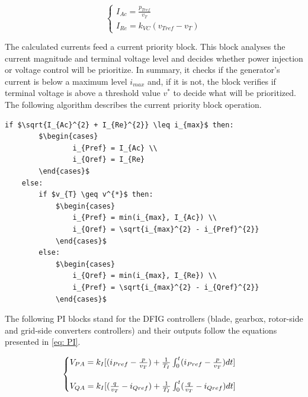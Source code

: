 \begin{equation}
	\begin{cases}
		I_{Ac} = \frac{p_{Tref}}{v_{T}} \\
		I_{Re} = k_{VC}(v_{Tref} - v_{T})
	\end{cases}
	\label{eq: Currents}
\end{equation}

The calculated currents feed a current priority block. This block analyses the current magnitude and terminal voltage level and decides whether power injection or voltage control will be prioritize. In summary, it checks if the generator's current is below a maximum level $i_{max}$ and, if it is not, the block verifies if terminal voltage is above a threshold value $v^{*}$ to decide what will be prioritized. The following algorithm describes the current priority block operation.

\begin{center}
	\begin{lstlisting}[mathescape, columns=fullflexible]
	if $\sqrt{I_{Ac}^{2} + I_{Re}^{2}} \leq i_{max}$ then:
		$\begin{cases}
				i_{Pref} = I_{Ac} \\
				i_{Qref} = I_{Re}
		\end{cases}$
	else:
		if $v_{T} \geq v^{*}$ then:	
			$\begin{cases}
				i_{Pref} = min(i_{max}, I_{Ac}) \\
				i_{Qref} = \sqrt{i_{max}^{2} - i_{Pref}^{2}}
			\end{cases}$
		else:
			$\begin{cases}
				i_{Qref} = min(i_{max}, I_{Re}) \\
				i_{Pref} = \sqrt{i_{max}^{2} - i_{Qref}^{2}}
			\end{cases}$
	\end{lstlisting}
\end{center}

The following PI blocks stand for the DFIG controllers (blade, gearbox, rotor-side and grid-side converters controllers) and their outputs follow the equations presented in \eqref{eq: PI}.

\begin{equation}
	\begin{cases}
		V_{PA} = k_{I}[(i_{Pref} - \frac{p}{v_{T}}) +\frac{1}{T_{I}}\int\displaylimits_{0}^{t}	(i_{Pref} - \frac{p}{v_{T}})dt]\\
		\\
		V_{QA} = k_{I}[(\frac{q}{v_{T}} - i_{Qref}) +\frac{1}{T_{I}}\int\displaylimits_{0}^{t}	(\frac{q}{v_{T}} - i_{Qref})dt]
	\end{cases}
	\label{eq: PI}
\end{equation}

